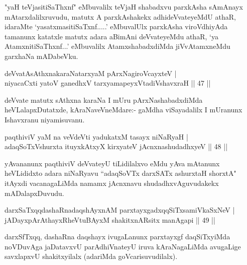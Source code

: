 \begin{artha}
"yaH teVjasitiSaThxnf" eMbuvalilx teVjaH shabadxvu parxkAsha sAmAnayx mAtarxdalilxruvudu, matutx A parxkAshakekx adhideVvateyeMdU athaR, idaraMte `yasatxmasitiSaTxnf.....' eMbuvalUlx parxkAsha viroVdhiyAda tamanunx katatxle matutx adara aBimAni deVvateyeMdu athaR, `ya AtamxnitiSaThxnf...' eMbuvalilx AtamxshabadxdiMda jiVvAtamxneMdu garxhaNa mADabeVku.
\end{artha}%


\begin{shl}
deVvatAsAthxnakaraNatarxyaM pArxNagiroVcayxteV |\\
niyacaCxti yatoV ganedhxV tarxyamapeyxVtadiVshavxraH \hfill || 47 ||
\end{shl}

\begin{artha}
deVvate matutx sAthxna karaNa I mUru pArxNashabadxdiMda heVLalapxDutatxde, kAraNaveVneMdare:- gaMdha viSayadalilx I mUranunx Ishavxranu niyamisuvanu.
\end{artha}


\begin{shl}
paqthiviV yaM na veVdeVti yadukatxM tasayx niNaRyaH |\\
adaqSoTxV\s shurxta ituyxkAtxyX kirxyateV jAcnxnashudadhxyeV \hfill || 48 ||
\end{shl}

\begin{artha}
yAvananunx paqthiviV deVvateyU tiLidilalxvo eMdu yAva mAtanunx heVLididxto adara niNaRyavu ``adaqSoVTx darxSATx ashurxtaH shorxtA" itAyxdi vacanagaLiMda namamx jAcnxnavu shudadhxvAguvudakekx mADalapxDuvudu.
\end{artha}


\begin{shl}
darxSaTxqqdashaRnadaqshAyxnAM parxtayxgadxqqSiTxsamiVkaSxNeV |\\
jADayxpArAthayxRheVtuBAyxM shakitxnARsitx manAgapi \hfill || 49 ||
\end{shl}

\begin{artha}
darxSfTxqq, dashaRna daqshayx ivugaLanunx parxtayxgf daqSiTxyiMda noVDuvAga jaDatavxvU parAdhiVnateyU iruva kAraNagaLiMda avugaLige savxlapxvU shakitxyilalx (adariMda goVcarisuvudilalx).
\end{artha}

